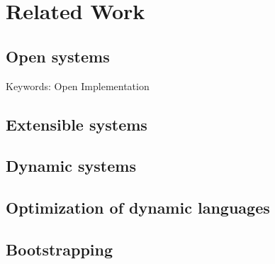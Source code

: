 
\chapter{Related Work}

\section{Open systems}
Keywords: Open Implementation

\section{Extensible systems}

\section{Dynamic systems}

\section{Optimization of dynamic languages}

\section{Bootstrapping}
